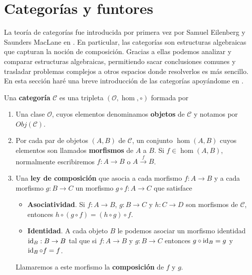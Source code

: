 \section{Categorías y funtores}
\label{sec:cat}

La teoría de categorías fue introducida por primera vez por Samuel Eilenberg y Saunders MacLane en \cite{eilenberg1945general}. En particular, las categorías son estructuras algebraicas que capturan la noción de composición. Gracias a ellas podemos analizar y comparar estructuras algebraicas, permitiendo sacar conclusiones comunes y trasladar problemas complejos a otros espacios donde resolverlos es más sencillo. En esta sección haré una breve introducción de las categorías apoyándome en \cite{mac2013categories}.

\begin{definicion}
	Una \textbf{categoría} $\mathcal{C}$ es una tripleta $(\mathcal{O}, \hom, \circ)$ formada por
	\begin{enumerate}
		\item Una clase $\mathcal{O}$, cuyos elementos denominamos \textbf{objetos} de $\mathcal{C}$ y notamos por $Obj(\mathcal{C})$.
		\item Por cada par de objetos $(A,B)$ de $\mathcal{C}$, un conjunto $\hom(A,B)$ cuyos elementos son llamados \textbf{morfismos} de $A$ a $B$. Si $f \in \hom(A,B)$, normalmente escribiremos $f: A \rightarrow B$ o $A \xrightarrow{f} B$.
		\item Una \textbf{ley de composición} que asocia a cada morfismo $f: A \rightarrow B$ y a cada morfismo $g: B \rightarrow C$ un morfismo $g \circ f : A \rightarrow C$ que satisface
		\begin{itemize}
			\item \textbf{Asociatividad}. Si $f: A \rightarrow B$, $g: B \rightarrow C$ y $h : C \rightarrow D$ son morfismos de $\mathcal{C}$, entonces $h \circ (g \circ f) = (h \circ g) \circ f$.
			\item \textbf{Identidad}. A cada objeto $B$ le podemos asociar un morfismo identidad $\operatorname{id}_B : B \rightarrow B$ tal que si $f: A \rightarrow B$ y $g: B \rightarrow C$ entonces $g \circ \operatorname{id}_B = g$ y $\operatorname{id}_B \circ f = f$.
		\end{itemize}
		Llamaremos a este morfismo la \textbf{composición} de $f$ y $g$.
	\end{enumerate}
\end{definicion}

